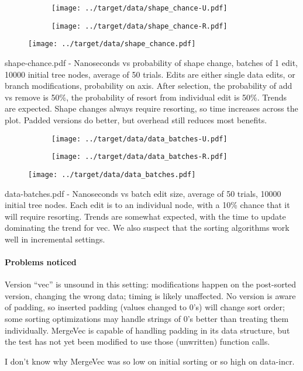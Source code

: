 \documentclass{article}
\begin{document}
\begin{figure}[H]
  \centering
  \begin{subfigure}{.5\textwidth}
    \texttt{[image: ../target/data/shape\_chance-U.pdf]}
  \end{subfigure}%
  \begin{subfigure}{.5\textwidth}
    \texttt{[image: ../target/data/shape\_chance-R.pdf]}
  \end{subfigure}
  \texttt{[image: ../target/data/shape\_chance.pdf]}
\end{figure}
shape-chance.pdf - Nanoseconds vs probability of shape change, batches of 1 edit, 10000 initial tree nodes, average of 50 trials. Edits are either single data edits, or branch modifications, probability on axis. After selection, the probability of add vs remove is 50\%, the probability of resort from individual edit is 50\%. Trends are expected. Shape changes always require resorting, so time increases across the plot. Padded versions do better, but overhead still reduces most benefits.

\begin{figure}[H]
  \centering
  \begin{subfigure}{.5\textwidth}
    \texttt{[image: ../target/data/data\_batches-U.pdf]}
  \end{subfigure}%
  \begin{subfigure}{.5\textwidth}
    \texttt{[image: ../target/data/data\_batches-R.pdf]}
  \end{subfigure}
  \texttt{[image: ../target/data/data\_batches.pdf]}
\end{figure}
data-batches.pdf - Nanoseconds vs batch edit size, average of 50 trials, 10000 initial tree nodes. Each edit is to an individual node, with a 10\% chance that it will require resorting. Trends are somewhat expected, with the time to update dominating the trend for vec. We also suspect that the sorting algorithms work well in incremental settings. 

\paragraph{Problems noticed} Version ``vec'' is unsound in this setting: modifications happen on the post-sorted version, changing the wrong data; timing is likely unaffected. No version is aware of padding, so inserted padding (values changed to 0's) will change sort order; some sorting optimizations may handle strings of 0's better than treating them individually. MergeVec is capable of handling padding in its data structure, but the test has not yet been modified to use those (unwritten) function calls.

I don't know why MergeVec was so low on initial sorting or so high on data-incr.


\cite{servo}



\end{document}
